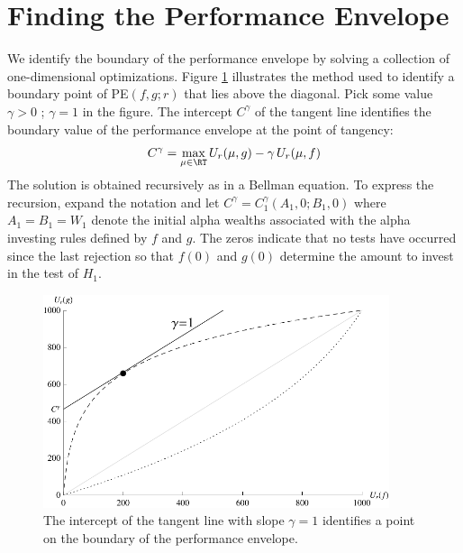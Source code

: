 \documentclass[12pt]{article}
\begin{document}
\section{Finding the Performance Envelope}

 We identify the boundary of the performance envelope by solving a collection of
 one-dimensional optimizations.  Figure \ref{fi:tangent} illustrates the method
 used to identify a boundary point of PE$(f,g; r)$ that lies above the diagonal.
  Pick some value $\gamma > 0$ \marginpar{$\gamma$}; $\gamma = 1$ in the figure.
  The intercept $C^\gamma$ of the tangent line identifies the boundary value of
 the performance envelope at the point of tangency:
 \begin{equation}
     C^\gamma = \max_{\mu \in \RT} U_r(\mu,g) - \gamma \, U_r(\mu,f) 
 \label{eq:opt}
 \end{equation}
 The solution is obtained recursively as in a Bellman equation.  To express the
 recursion, expand the notation and let $C^\gamma = C_1^\gamma(A_1,0;B_1,0)$
 where $A_1=B_1=W_1$ denote the initial alpha wealths associated with the alpha
 investing rules defined by $f$ and $g$. The zeros indicate that no tests have
 occurred since the last rejection so that $f(0)$ and $g(0)$ determine the amount
 to invest in the test of $H_1$.


 \begin{figure}
 \caption{ \label{fi:tangent} The intercept of the tangent line with slope
 $\gamma = 1$ identifies a point on the boundary of the performance envelope. }
 \centerline{ \includegraphics[width=4in]{tangent} }
 \end{figure}
\end{document}
